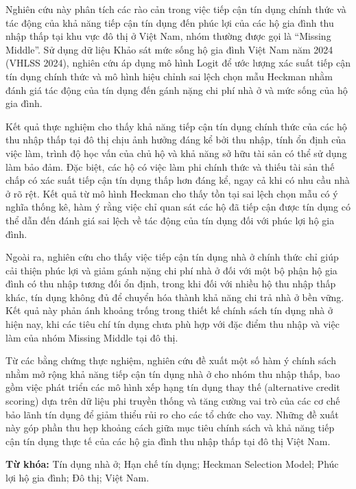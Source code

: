 \documentclass[12pt,a4paper]{report}
\begin{document}
	Nghiên cứu này phân tích các rào cản trong việc tiếp cận tín dụng chính thức và tác động của khả năng tiếp cận tín dụng đến phúc lợi của các hộ gia đình thu nhập thấp tại khu vực đô thị ở Việt Nam, nhóm thường được gọi là ``Missing Middle''. Sử dụng dữ liệu Khảo sát mức sống hộ gia đình Việt Nam năm 2024 (VHLSS 2024), nghiên cứu áp dụng mô hình Logit để ước lượng xác suất tiếp cận tín dụng chính thức và mô hình hiệu chỉnh sai lệch chọn mẫu Heckman nhằm đánh giá tác động của tín dụng đến gánh nặng chi phí nhà ở và mức sống của hộ gia đình.
	
	Kết quả thực nghiệm cho thấy khả năng tiếp cận tín dụng chính thức của các hộ thu nhập thấp tại đô thị chịu ảnh hưởng đáng kể bởi thu nhập, tính ổn định của việc làm, trình độ học vấn của chủ hộ và khả năng sở hữu tài sản có thể sử dụng làm bảo đảm. Đặc biệt, các hộ có việc làm phi chính thức và thiếu tài sản thế chấp có xác suất tiếp cận tín dụng thấp hơn đáng kể, ngay cả khi có nhu cầu nhà ở rõ rệt. Kết quả từ mô hình Heckman cho thấy tồn tại sai lệch chọn mẫu có ý nghĩa thống kê, hàm ý rằng việc chỉ quan sát các hộ đã tiếp cận được tín dụng có thể dẫn đến đánh giá sai lệch về tác động của tín dụng đối với phúc lợi hộ gia đình.
	
	Ngoài ra, nghiên cứu cho thấy việc tiếp cận tín dụng nhà ở chính thức chỉ giúp cải thiện phúc lợi và giảm gánh nặng chi phí nhà ở đối với một bộ phận hộ gia đình có thu nhập tương đối ổn định, trong khi đối với nhiều hộ thu nhập thấp khác, tín dụng không đủ để chuyển hóa thành khả năng chi trả nhà ở bền vững. Kết quả này phản ánh khoảng trống trong thiết kế chính sách tín dụng nhà ở hiện nay, khi các tiêu chí tín dụng chưa phù hợp với đặc điểm thu nhập và việc làm của nhóm Missing Middle tại đô thị.
	
	Từ các bằng chứng thực nghiệm, nghiên cứu đề xuất một số hàm ý chính sách nhằm mở rộng khả năng tiếp cận tín dụng nhà ở cho nhóm thu nhập thấp, bao gồm việc phát triển các mô hình xếp hạng tín dụng thay thế (alternative credit scoring) dựa trên dữ liệu phi truyền thống và tăng cường vai trò của các cơ chế bảo lãnh tín dụng để giảm thiểu rủi ro cho các tổ chức cho vay. Những đề xuất này góp phần thu hẹp khoảng cách giữa mục tiêu chính sách và khả năng tiếp cận tín dụng thực tế của các hộ gia đình thu nhập thấp tại đô thị Việt Nam.
	
	\textbf{Từ khóa:} Tín dụng nhà ở; Hạn chế tín dụng; Heckman Selection Model; Phúc lợi hộ gia đình; Đô thị; Việt Nam.
		
\end{document}
